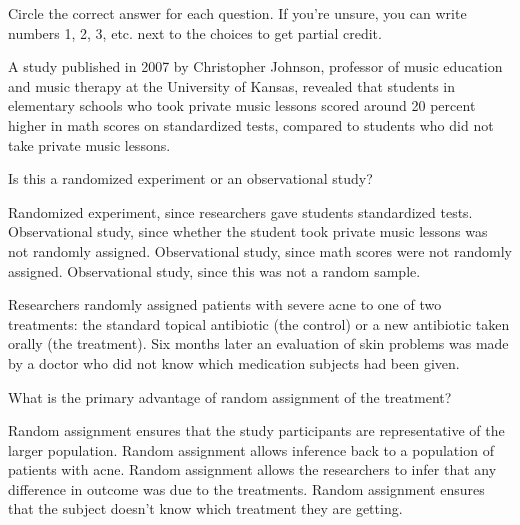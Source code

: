 \documentclass{article}
\begin{document}
	Circle the correct answer for each question.  If you're unsure, you can write numbers 1, 2, 3, etc. next to the choices to get partial credit.\\[.5cm]
	
	\begin{mcquestions}
		\begin{mcquestioninstruction}
			A study published in 2007 by Christopher Johnson, professor of music education and music therapy at the University of Kansas, revealed that students in elementary schools who took private music lessons scored around 20 percent higher in math scores on standardized tests, compared to  students who did not take private music lessons.
		\end{mcquestioninstruction}
		\question Is this a randomized experiment or an observational study?
		\begin{mcanswerslist}
			\answer Randomized experiment, since researchers gave students standardized tests.
			\answer[correct] Observational study, since whether the student took private music lessons was not randomly assigned.
			\answer Observational study, since math scores were not randomly assigned.
			\answer Observational study, since this was not a random sample.
		\end{mcanswerslist}
		
		\begin{mcquestioninstruction}
			Researchers randomly assigned patients with severe acne to one of two treatments: the standard topical antibiotic (the control) or a new antibiotic taken orally (the treatment). Six months later an evaluation of skin problems was made by a doctor who did not know which medication subjects had been given.
		\end{mcquestioninstruction}
		
		\question What is the primary advantage of random assignment of the treatment?
		\begin{mcanswerslist}
			\answer Random assignment ensures that the study participants are representative of the larger population.
			\answer Random assignment allows inference back to a population of patients with acne.
			\answer[correct] Random assignment allows the researchers to infer that any difference in outcome was due to the treatments.
			\answer Random assignment ensures that the subject doesn't know which treatment they are getting.
		\end{mcanswerslist}
		

\end{mcquestions}
\end{document}
